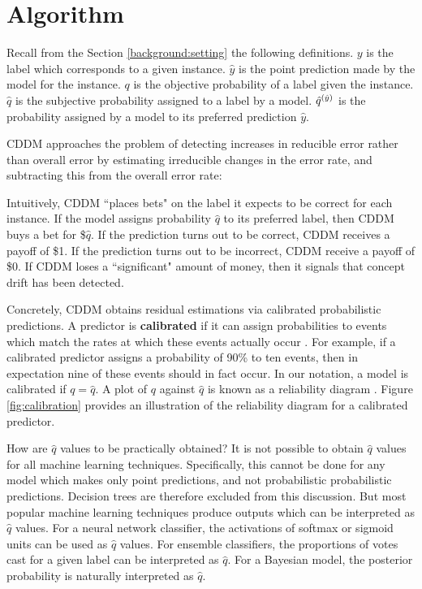 
\section{Algorithm} \label{CDDM:algorithm}

Recall from the Section \ref{background:setting} the following definitions. $y$ is the label which corresponds to a given instance. $\hat{y}$ is the point prediction made by the model for the instance. $q$ is the objective probability of a label given the instance. $\hat{q}$ is the subjective probability assigned to a label by a model.  $\hat{q}^{(\hat{y})}$ is the probability assigned by a model to its preferred prediction $\hat{y}$. 

CDDM approaches the problem of detecting increases in reducible error rather than overall error by estimating irreducible changes in the error rate, and subtracting this from the overall error rate:

Intuitively, CDDM ``places bets" on the label it expects to be correct for each instance. If the model assigns probability $\hat{q}$ to its preferred label, then CDDM buys a bet for \$$\hat{q}$. If the prediction turns out to be correct, CDDM receives a payoff of \$1. If the prediction turns out to be incorrect, CDDM receive a payoff of \$0. If CDDM loses a ``significant" amount of money, then it signals that concept drift has been detected.

Concretely, CDDM obtains residual estimations via calibrated probabilistic predictions. A predictor is {\bf calibrated} if it can assign probabilities to events which match the rates at which these events actually occur \cite{superforecasting}\cite{scoring_rules}\cite{calibrating}. For example, if a calibrated predictor assigns a probability of 90\% to ten events, then in expectation nine of these events should in fact occur. In our notation, a model is calibrated if $q=\hat{q}$. A plot of $q$ against $\hat{q}$ is known as a reliability diagram \cite{calibrating}. Figure \ref{fig:calibration} provides an illustration of the reliability diagram for a calibrated predictor.



How are $\hat{q}$ values to be practically obtained? It is not possible to obtain $\hat{q}$ values for all machine learning techniques. Specifically, this cannot be done for any model which makes only point predictions, and not probabilistic probabilistic predictions. Decision trees are therefore excluded from this discussion. But most popular machine learning techniques produce outputs which can be interpreted as $\hat{q}$ values. For a neural network classifier, the activations of softmax or sigmoid units can be used as $\hat{q}$ values. For ensemble classifiers, the proportions of votes cast for a given label can be interpreted as $\hat{q}$. For a Bayesian model, the posterior probability is naturally interpreted as $\hat{q}$.

